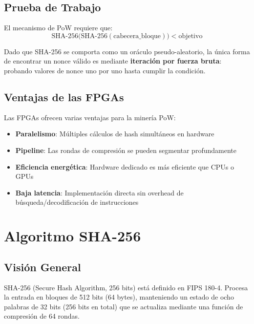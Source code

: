 \documentclass[12pt,a4paper]{article}
\begin{document}
\subsection{Prueba de Trabajo}

El mecanismo de PoW requiere que:
\begin{equation}
    \text{SHA-256}\bigl(\text{SHA-256}(\text{cabecera\_bloque})\bigr) < \text{objetivo}
\end{equation}

Dado que SHA-256 se comporta como un or\'aculo pseudo-aleatorio, la \'unica forma
de encontrar un nonce v\'alido es mediante \textbf{iteraci\'on por fuerza bruta}:
probando valores de nonce uno por uno hasta cumplir la condici\'on.

\subsection{Ventajas de las FPGAs}

Las FPGAs ofrecen varias ventajas para la miner\'ia PoW:
\begin{itemize}[leftmargin=2em]
    \item \textbf{Paralelismo}: M\'ultiples c\'alculos de hash simult\'aneos en hardware
    \item \textbf{Pipeline}: Las rondas de compresi\'on se pueden segmentar profundamente
    \item \textbf{Eficiencia energ\'etica}: Hardware dedicado es m\'as eficiente que CPUs o GPUs
    \item \textbf{Baja latencia}: Implementaci\'on directa sin overhead de b\'usqueda/decodificaci\'on de instrucciones
\end{itemize}

\section{Algoritmo SHA-256}

\subsection{Visi\'on General}

SHA-256 (Secure Hash Algorithm, 256 bits) est\'a definido en FIPS 180-4.
Procesa la entrada en bloques de 512 bits (64 bytes), manteniendo un estado
de ocho palabras de 32 bits (256 bits en total) que se actualiza mediante
una funci\'on de compresi\'on de 64 rondas.
\end{document}
